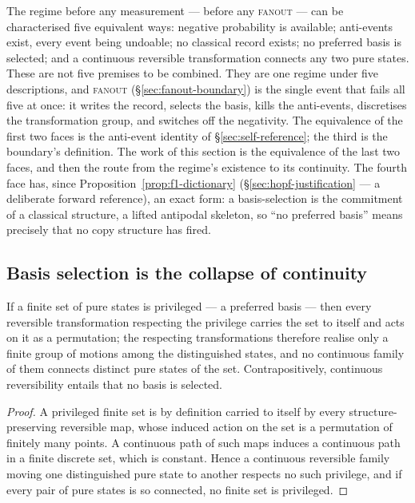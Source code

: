 The regime before any measurement --- before any \textsc{fanout} --- can be characterised five
equivalent ways: negative probability is available; anti-events exist, every event being undoable;
no classical record exists; no preferred basis is selected; and a continuous reversible
transformation connects any two pure states. These are not five premises to be combined. They are
one regime under five descriptions, and \textsc{fanout} (\S\ref{sec:fanout-boundary}) is the single
event that fails all five at once: it writes the record, selects the basis, kills the anti-events,
discretises the transformation group, and switches off the negativity. The equivalence of the first
two faces is the anti-event identity of \S\ref{sec:self-reference}; the third is the boundary's
definition. The work of this section is the equivalence of the last two faces, and then the route
from the regime's existence to its continuity. The fourth face has, since
Proposition~\ref{prop:f1-dictionary} (\S\ref{sec:hopf-justification} --- a deliberate forward
reference), an exact form: a basis-selection is the commitment of a classical structure, a lifted
antipodal skeleton, so ``no preferred basis'' means precisely that no copy structure has fired.

\subsection{Basis selection is the collapse of continuity}

\begin{proposition}\label{prop:basis-discreteness}
If a finite set of pure states is privileged --- a preferred basis --- then every reversible
transformation respecting the privilege carries the set to itself and acts on it as a permutation;
the respecting transformations therefore realise only a finite group of motions among the
distinguished states, and no continuous family of them connects distinct pure states of the set.
Contrapositively, continuous reversibility entails that no basis is selected.
\end{proposition}

\begin{proof}
A privileged finite set is by definition carried to itself by every structure-preserving reversible
map, whose induced action on the set is a permutation of finitely many points. A continuous path of
such maps induces a continuous path in a finite discrete set, which is constant. Hence a continuous
reversible family moving one distinguished pure state to another respects no such privilege, and if
every pair of pure states is so connected, no finite set is privileged.
\end{proof}

